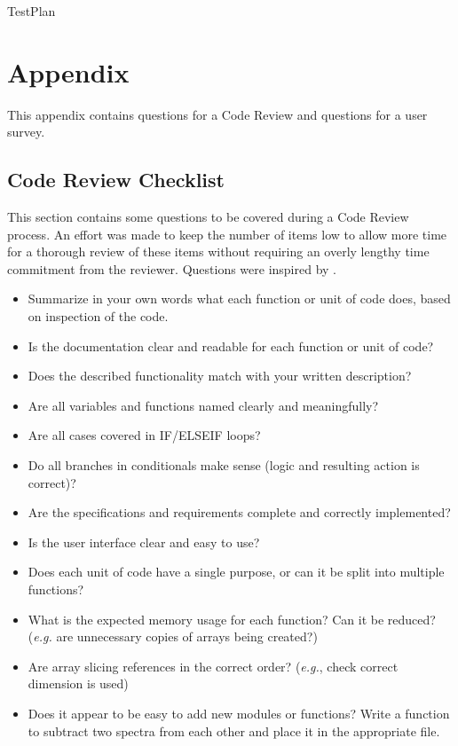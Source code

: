 \documentclass[12pt, titlepage]{article}
\begin{document}
 {TestPlan}

\newpage

\section{Appendix}
\label{App:CodeRev}
This appendix contains questions for a Code Review and questions for a user
survey.

\subsection{Code Review Checklist}
This section contains some questions to be covered during a Code Review process.
An effort was made to keep the number of items low to allow more time for a
thorough review of these items without requiring an overly lengthy time
commitment from the reviewer. Questions were inspired by
\cite{office_of_safety_and_mission_assurance_software_1993,
karl_e._wiegers_generic_2001, erik_dietrich_creating_2015}.
\begin{itemize}
\item Summarize in your own words what each function or unit of code does, based
on inspection of the code. 
\item Is the documentation clear and readable for each function or unit of code?
\item Does the described functionality match with your written description?
\item Are all variables and functions named clearly and meaningfully?
\item Are all cases covered in IF/ELSEIF loops?
\item Do all branches in conditionals make sense (logic and resulting action is
correct)?
\item Are the specifications and requirements complete and correctly
implemented?
\item Is the user interface clear and easy to use?
\item Does each unit of code have a single purpose, or can it be split into
multiple functions?
\item What is the expected memory usage for each function? Can it be reduced?
(\textit{e.g.} are unnecessary copies of arrays being created?)
\item Are array slicing references in the correct order? (\textit{e.g.}, check
correct dimension is used)
\item Does it appear to be easy to add new modules or functions? Write a
function to subtract two spectra from each other and place it in the appropriate
file.
\end{itemize}
\end{document}
